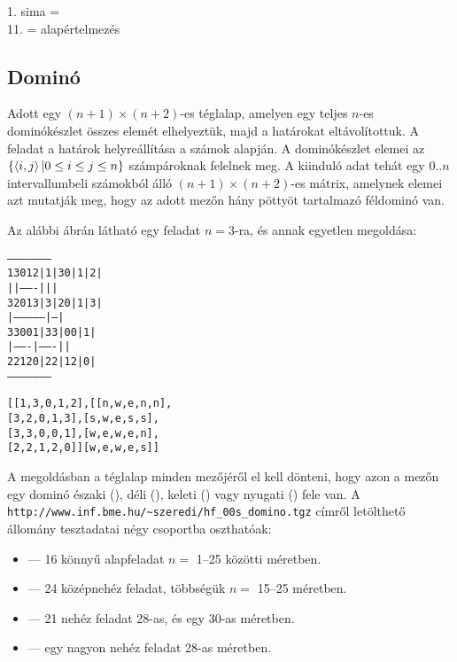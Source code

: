 1. sima = \\
11. = alapértelmezés



\subsection{Dominó}

Adott egy $(n+1)\times(n+2)$-es téglalap, amelyen egy teljes $n$-es dominókészlet
összes elemét elhelyeztük, majd a határokat eltávolítottuk. A feladat a határok
helyreállítása a számok alapján. A dominókészlet elemei az
$\{\left\langle i,j\right\rangle | 0 \leq i  \leq j \leq n \}$ számpároknak felelnek meg. A kiinduló
adat tehát egy $0..n$ intervallumbeli számokból álló $(n+1)\times(n+2)$-es mátrix,
amelynek elemei azt mutatják meg, hogy az adott mezőn hány pöttyöt tartalmazó féldominó
van.

Az alábbi ábrán látható egy feladat $n=3$-ra, és annak egyetlen megoldása:

\begin{alltt}
                                  ---------------------
     1   3   0   1   2            | 1 | 3   0 | 1 | 2 |
                                  |   |-------|   |   |
     3   2   0   1   3            | 3 | 2   0 | 1 | 3 |
                                  |---------------|---|
     3   3   0   0   1            | 3   3 | 0   0 | 1 |
                                  |-------|-------|   |
     2   2   1   2   0            | 2   2 | 1   2 | 0 |
                                  ---------------------

   % Bemenő adatformátum:         % A megoldás Prolog alakja:

   [[1,  3,  0,  1,  2],          [[n,  w,  e,  n,  n],
    [3,  2,  0,  1,  3],           [s,  w,  e,  s,  s],
    [3,  3,  0,  0,  1],           [w,  e,  w,  e,  n],
    [2,  2,  1,  2,  0]]           [w,  e,  w,  e,  s]]

\end{alltt}

A megoldásban a téglalap minden mezőjéről el kell dönteni, hogy azon a mezőn egy dominó
északi (), déli (), keleti () vagy nyugati () fele van. A
\verb'http://www.inf.bme.hu/~szeredi/hf_00s_domino.tgz' címről letölthető állomány
tesztadatai négy csoportba oszthatóak:

\begin{itemize}
\item {} --- 16 könnyű alapfeladat $n = $ 1--25 közötti méretben.
\item {} --- 24 középnehéz feladat, többségük $n = $ 15--25 méretben.
\item {} --- 21 nehéz feladat 28-as, és egy 30-as méretben.
\item {} --- egy nagyon nehéz feladat 28-as méretben.
\end{itemize}

